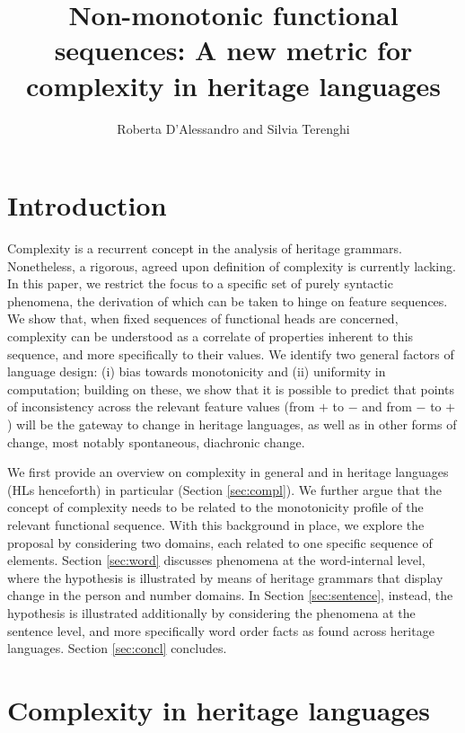 \documentclass[output=paper]{langscibook}
\title{Non-monotonic functional sequences: A new metric for complexity in heritage languages}
\author{Roberta D'Alessandro\affiliation{Utrecht University} and Silvia Terenghi\affiliation{Utrecht University}}
\begin{document}
\maketitle


\section{Introduction}

Complexity is a recurrent concept in the analysis of heritage grammars. Nonetheless, a rigorous, agreed upon definition of complexity is currently lacking. In this paper, we restrict the focus to a specific set of purely syntactic phenomena, the derivation of which can be taken to hinge on feature sequences. We show that, when fixed sequences of functional heads are concerned, complexity can be understood as a correlate of properties inherent to this sequence, and more specifically to their values. We identify two general factors of language design: (i) bias towards monotonicity and (ii) uniformity in computation; building on these, we show that it is possible to predict that points of inconsistency across the relevant feature values (from $+$ to $-$ and from $-$ to $+$) will be the gateway to change in heritage languages, as well as in other forms of change, most notably spontaneous, diachronic change.

We first provide an overview on complexity in general and in heritage languages (HLs henceforth) in particular (Section \ref{sec:compl}). We further argue that the concept of complexity needs to be related to the monotonicity profile of the relevant functional sequence. With this background in place, we explore the proposal by considering two domains, each related to one specific sequence of elements. Section \ref{sec:word} discusses phenomena at the word-internal level, where the hypothesis is illustrated by means of heritage grammars that display change in the person and number domains. In Section \ref{sec:sentence}, instead, the hypothesis is illustrated additionally by considering the phenomena at the sentence level, and more specifically word order facts as found across heritage languages. Section \ref{sec:concl} concludes.


\section{Complexity in heritage languages\label{sec:compl}}
\end{document}
